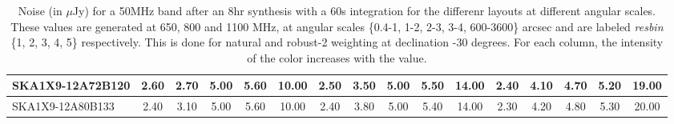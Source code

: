 \begin{table}[htp]
{{\begin{tabular}{|lccccc||ccccc||ccccc|}
SKA1X9-12A72B120 & 2.60 \cellcolor{blue!32.00} & 2.70 \cellcolor{red!30.00} & 5.00 \cellcolor{green!60.00} & 5.60 \cellcolor{orange!60.00} & 10.00 \cellcolor{purple!21.82} & 2.50 \cellcolor{blue!25.00} & 3.50 \cellcolor{red!48.80} & 5.00 \cellcolor{green!60.00} & 5.50 \cellcolor{orange!60.00} & 14.00 \cellcolor{purple!60.00} & 2.40 \cellcolor{blue!23.25} & 4.10 \cellcolor{red!54.75} & 4.70 \cellcolor{green!53.00} & 5.20 \cellcolor{orange!54.75} & 19.00 \cellcolor{purple!39.00}\\ \hline 
SKA1X9-12A80B133 & 2.40 \cellcolor{blue!18.00} & 3.10 \cellcolor{red!42.00} & 5.00 \cellcolor{green!60.00} & 5.60 \cellcolor{orange!60.00} & 10.00 \cellcolor{purple!21.82} & 2.40 \cellcolor{blue!18.00} & 3.80 \cellcolor{red!57.20} & 5.00 \cellcolor{green!60.00} & 5.40 \cellcolor{orange!54.00} & 14.00 \cellcolor{purple!60.00} & 2.30 \cellcolor{blue!18.00} & 4.20 \cellcolor{red!60.00} & 4.80 \cellcolor{green!60.00} & 5.30 \cellcolor{orange!60.00} & 20.00 \cellcolor{purple!60.00}\\ \hline 
\end{tabular}}
\vspace{-0.300000cm}
\hspace{1cm} 

\vspace{.25cm}
\caption{Noise (in $\mu$Jy) for a 50MHz band after an 8hr synthesis with a 60s integration for the differenr layouts at different angular scales. These values are generated at 650, 800 and 1100 MHz, at angular scales \{0.4-1, 1-2, 2-3, 3-4, 600-3600\} arcsec and are labeled {\it resbin} \{1, 2, 3, 4, 5\} respectively. This is done for natural and robust-2 weighting at declination -30 degrees. For each column, the intensity of the color increases with the value.}\label{tab:noise50}}
 \end{table}
